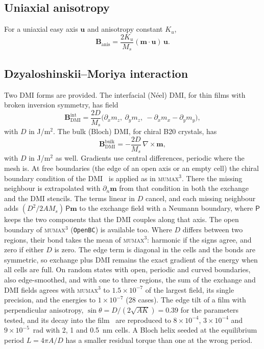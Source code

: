 \documentclass{article}      %
\newcommand{\mumax}{\textsc{mumax}$^3$}
\newcommand{\vm}{\bm{m}}
\newcommand{\vB}{\bm{B}}
\begin{document}
\subsection{Uniaxial anisotropy}

For a uniaxial easy axis $\bm{u}$ and anisotropy constant $K_u$,
%
\begin{equation}
  \vB_{\mathrm{anis}} = \frac{2K_u}{M_s}(\vm\cdot\bm{u})\,\bm{u}.
  \label{eq:anis}
\end{equation}

\subsection{Dzyaloshinskii--Moriya interaction}

Two DMI forms are provided. The interfacial (N\'eel) DMI, for thin films with
broken inversion symmetry, has field
%
\begin{equation}
  \vB_{\mathrm{DMI}}^{\mathrm{int}}
  = \frac{2D}{M_s}
    \Big(\partial_x m_z,\ \partial_y m_z,\ -\partial_x m_x-\partial_y m_y\Big),
\end{equation}
%
with $D$ in J/m$^2$. The bulk (Bloch) DMI, for chiral B20 crystals, has
%
\begin{equation}
  \vB_{\mathrm{DMI}}^{\mathrm{bulk}} = -\frac{2D}{M_s}\,\nabla\times\vm,
\end{equation}
%
with $D$ in J/m$^2$ as well. Gradients use central differences, periodic where the
mesh is. At free boundaries (the edge of an open axis or an empty cell) the chiral
boundary condition of the DMI~\cite{rohart2013} is applied as in \mumax{}. There the
missing neighbour is extrapolated with $\partial_n\vm$ from that condition in both
the exchange and the DMI stencils. The terms linear in $D$ cancel, and each missing
neighbour adds $(D^2/2AM_s)\,\mathsf{P}\vm$ to the exchange field with a Neumann
boundary, where $\mathsf{P}$ keeps the two components that the DMI couples along that
axis. The open boundary of \mumax{} (\texttt{OpenBC}) is available too. Where $D$
differs between two regions, their bond takes the mean of \mumax{}: harmonic if the
signs agree, and zero if either $D$ is zero. The edge term is diagonal in the cells and
the bonds are symmetric, so exchange plus DMI remains the exact gradient of the energy
when all cells are full. On random states with open, periodic and curved boundaries,
also edge-smoothed, and with one to three regions, the sum of the exchange and DMI
fields agrees with \mumax{} to $1.5\times10^{-7}$ of the largest field, its single
precision, and the energies to $1\times10^{-7}$ (28 cases). The edge tilt of a film with perpendicular
anisotropy, $\sin\theta=D/(2\sqrt{AK})=0.39$ for the parameters tested, and its
decay into the film~\cite{rohart2013} are reproduced to $8\times10^{-4}$,
$3\times10^{-4}$ and $9\times10^{-5}$~rad with 2, 1 and 0.5~nm cells. A Bloch helix
seeded at the equilibrium period $L = 4\pi A/D$ has a smaller residual torque than
one at the wrong period.
\end{document}
